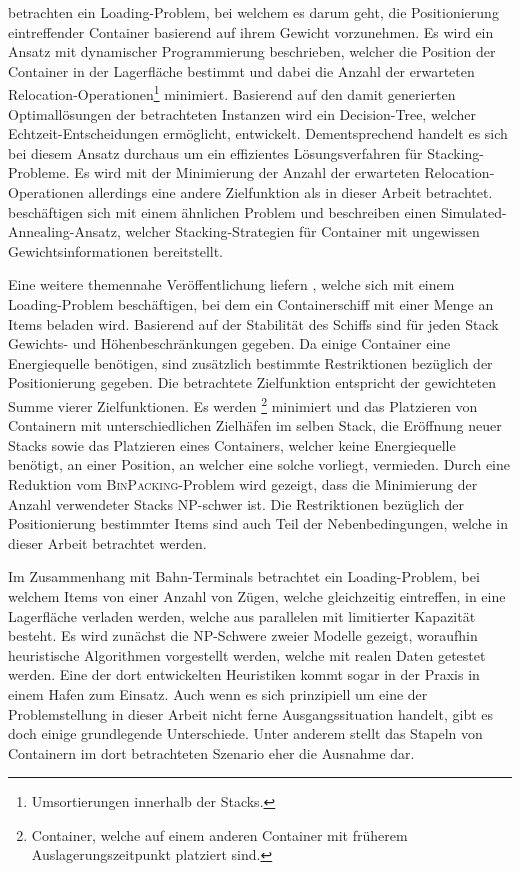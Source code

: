 \citet{Kim2000} betrachten ein Loading-Problem, bei welchem es darum geht, die Positionierung eintreffender
Container basierend auf ihrem Gewicht vorzunehmen. Es wird ein Ansatz mit dynamischer Programmierung beschrieben,
welcher die Position der Container in der Lagerfläche bestimmt und dabei die Anzahl der erwarteten
Relocation-Operationen\footnote{Umsortierungen innerhalb der Stacks.} minimiert.
Basierend auf den damit generierten Optimallösungen der betrachteten Instanzen wird ein Decision-Tree, welcher Echtzeit-Entscheidungen ermöglicht, entwickelt.
Dementsprechend handelt es sich bei diesem Ansatz durchaus um ein effizientes Lösungsverfahren für Stacking-Probleme.
Es wird mit der Minimierung der Anzahl der erwarteten Relocation-Operationen allerdings eine andere Zielfunktion
als in dieser Arbeit betrachtet.\newline
\citet{Kang2006} beschäftigen sich mit einem ähnlichen Problem und beschreiben einen Simulated-Annealing-Ansatz,
welcher Stacking-Strategien für Container mit ungewissen Gewichtsinformationen bereitstellt.

\pagebreak

Eine weitere themennahe Veröffentlichung liefern \citet{Delgado2012}, welche sich mit einem
Loading-Problem beschäftigen, bei dem ein Containerschiff mit einer Menge an Items beladen wird.
Basierend auf der Stabilität des Schiffs sind für jeden Stack Gewichts- und Höhenbeschränkungen gegeben.
Da einige Container eine Energiequelle benötigen, sind zusätzlich bestimmte Restriktionen bezüglich der
Positionierung gegeben.
Die betrachtete Zielfunktion entspricht der gewichteten Summe vierer Zielfunktionen.
Es werden \footnote{Container, welche auf einem anderen Container mit früherem Auslagerungszeitpunkt platziert sind.} minimiert und das Platzieren von Containern mit unterschiedlichen Zielhäfen
im selben Stack, die Eröffnung neuer Stacks sowie das Platzieren eines Containers,
welcher keine Energiequelle benötigt, an einer Position, an welcher eine solche vorliegt, vermieden.
Durch eine Reduktion vom \textsc{BinPacking}-Problem wird gezeigt,
dass die Minimierung der Anzahl verwendeter Stacks NP-schwer ist.
Die Restriktionen bezüglich der Positionierung bestimmter Items sind auch Teil der Nebenbedingungen,
welche in dieser Arbeit betrachtet werden.

Im Zusammenhang mit Bahn-Terminals betrachtet \citet{Jaehn2013} ein Loading-Problem,
bei welchem Items von einer Anzahl von Zügen, welche gleichzeitig eintreffen,
in eine Lagerfläche verladen werden, welche aus parallelen  mit limitierter Kapazität besteht.
Es wird zunächst die NP-Schwere zweier Modelle gezeigt, woraufhin heuristische Algorithmen vorgestellt werden,
welche mit realen Daten getestet werden. Eine der dort entwickelten Heuristiken kommt sogar in der Praxis
in einem Hafen zum Einsatz. Auch wenn es sich prinzipiell um eine der Problemstellung in dieser
Arbeit nicht ferne Ausgangssituation handelt, gibt es doch einige grundlegende Unterschiede.
Unter anderem stellt das Stapeln von Containern im dort betrachteten Szenario eher die Ausnahme dar.

